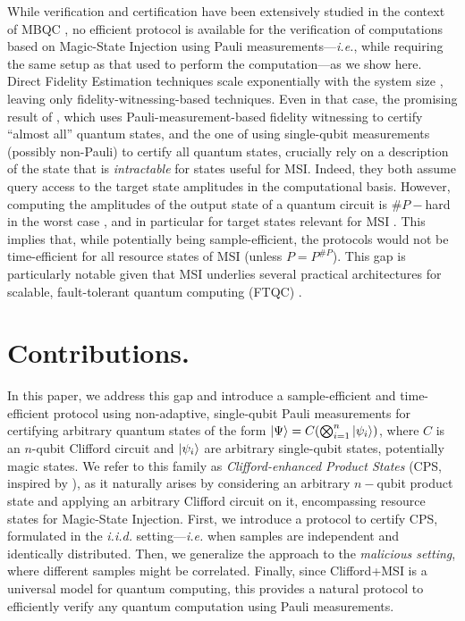 \documentclass[a4paper]{article}
\begin{document}
While verification and certification have been extensively studied in the context of MBQC \cite{TM17verification, TMMM18resource, ZH19efficient, ZH18efficient, LZH23robust}, no efficient protocol is available for the verification of computations based on Magic-State Injection using Pauli measurements—\emph{i.e.}, while requiring the same setup as that used to perform the computation—as we show here.
Direct Fidelity Estimation techniques scale exponentially with the system size \cite{FL11direct, FKMO24learning, SLP11practical}, leaving only fidelity-witnessing-based techniques. Even in that case, the promising result of \cite{HPS24certifying}, which uses Pauli-measurement-based fidelity witnessing to certify “almost all” quantum states, 
and the one of \cite{GHO25few} using single-qubit measurements (possibly non-Pauli) to certify all quantum states, 
crucially rely on a description of the state that is \emph{intractable} for states useful for MSI. 
Indeed, they both assume query access to the target state amplitudes in the computational basis. However, computing the amplitudes of the output state of a quantum circuit is $\#P-$hard in the worst case \cite{A04quantuma, BFNV18quantum}, and in particular for target states relevant for MSI \cite{YJS18quantum}.
This implies that, while potentially being sample-efficient, the protocols \cite{HPS24certifying,GHO25few} would not be time-efficient for all resource states of MSI (unless $P=P^{\#P}$).
This gap is particularly notable given that MSI underlies several practical architectures for scalable, fault-tolerant quantum computing (FTQC) \cite{MGCM25ibm, GSJ24magic}.


\section{Contributions.}
In this paper, we address this gap and introduce a sample-efficient and time-efficient protocol using non-adaptive, single-qubit Pauli measurements for certifying arbitrary quantum states of the form
    $\ket{\Psi} = C\!\left(\bigotimes_{i=1}^n \ket{\psi_i}\right)$,
where $C$ is an $n$-qubit Clifford circuit and $\ket{\psi_i}$ are arbitrary single-qubit states, potentially magic states. 
We refer to this family as \emph{Clifford-enhanced Product States} (CPS, inspired by \cite{LHD24quantum}), as it naturally arises by considering an arbitrary $n-$qubit product state and applying an arbitrary Clifford circuit on it, encompassing resource states for Magic-State Injection.
First, we introduce a protocol to certify CPS, 
formulated in the \emph{i.i.d.} setting—\emph{i.e.} when samples are independent and identically distributed. Then, we generalize the approach to the \emph{malicious setting}, where different samples might be correlated. Finally, since Clifford+MSI is a universal model for quantum computing, this provides a natural protocol to efficiently verify any quantum computation using Pauli measurements.
\end{document}
